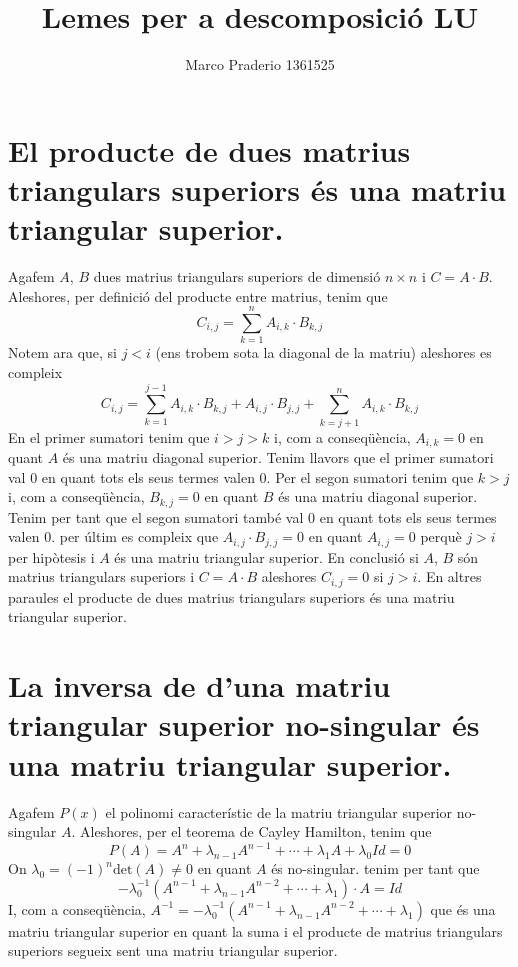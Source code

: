 \documentclass[a4paper,10pt]{article}
\title{Lemes per a descomposició LU}
\author{Marco Praderio 1361525}
\date{}
\renewcommand{\*}{\cdot}
\begin{document}
\maketitle
\section{El producte de dues matrius triangulars superiors és una matriu triangular superior.}
Agafem $A$, $B$ dues matrius triangulars superiors de dimensió $n\times n$ i $C=A\*B$. Aleshores, per definició del producte entre matrius, tenim que
$$C_{i,j}=\sum_{k=1}^nA_{i,k}\*B_{k,j}$$
Notem ara que, si $j<i$ (ens trobem sota la diagonal de la matriu) aleshores es compleix
$$C_{i,j}=\sum_{k=1}^{j-1}A_{i,k}\*B_{k,j}+A_{i,j}\*B_{j,j}+\sum_{k=j+1}^nA_{i,k}\*B_{k,j}$$
En el primer sumatori tenim que $i>j>k$ i, com a conseqüència, $A_{i,k}=0$ en quant $A$ és una matriu diagonal superior. Tenim llavors que el primer sumatori val 0 en quant
tots els seus termes valen 0. Per el segon sumatori tenim que $k>j$ i, com a conseqüència, $B_{k,j}=0$ en quant $B$ és una matriu diagonal superior. Tenim per tant que 
el segon sumatori també val 0 en quant tots els seus termes valen 0. per últim es compleix que $A_{i,j}\*B_{j,j}=0$ en quant $A_{i,j}=0$ perquè $j>i$ per hipòtesis i $A$ és
una matriu triangular superior. En conclusió si $A$, $B$ són matrius triangulars superiors i $C=A\*B$ aleshores $C_{i,j}=0$ si $j>i$. En altres paraules el producte de dues
matrius triangulars superiors és una matriu triangular superior.
\section{La inversa de d'una matriu triangular superior no-singular és una matriu triangular superior.}
Agafem $P(x)$ el polinomi característic de la matriu triangular superior no-singular $A$. Aleshores, per el teorema de Cayley Hamilton, tenim que
$$P(A)=A^n+\lambda_{n-1}A^{n-1}+\cdots+\lambda_{1}A+\lambda_0Id=0$$
On $\lambda_0=(-1)^n\text{det}(A)\not=0$ en quant $A$ és no-singular. tenim per tant que
$$-\lambda_0^{-1}(A^{n-1}+\lambda_{n-1}A^{n-2}+\cdots+\lambda_{1})\*A=Id$$
I, com a conseqüència, $A^{-1}=-\lambda_0^{-1}(A^{n-1}+\lambda_{n-1}A^{n-2}+\cdots+\lambda_{1})$ que és una matriu triangular superior en quant la suma i el producte de
matrius triangulars superiors segueix sent una matriu triangular superior.
\end{document}
